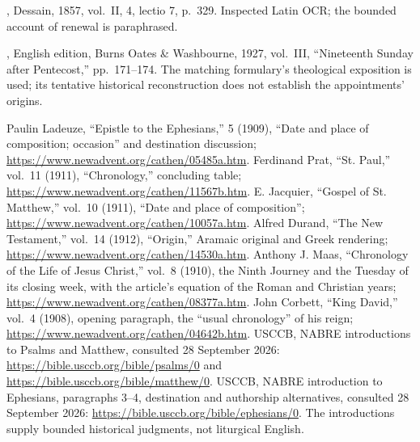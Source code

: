\begin{description}[style=nextline,leftmargin=0pt,labelsep=0pt,itemsep=.45em]
\item[Thomas Aquinas]
, Dessain,
1857, vol.~II,  4, lectio 7, p.~329.
Inspected Latin OCR; the bounded account of renewal is paraphrased.

\item[Blessed Ildefonso Schuster]
, English edition, Burns Oates \& Washbourne,
1927, vol.~III, ``Nineteenth Sunday after Pentecost,'' pp.~171--174.
The matching formulary's theological exposition is used; its
tentative historical reconstruction does not establish the
appointments' origins.

\item[Scriptural chronology and location]
Paulin Ladeuze, ``Epistle to the Ephesians,''  5 (1909), ``Date and place of composition; occasion''
and destination discussion;
\url{https://www.newadvent.org/cathen/05485a.htm}.
Ferdinand Prat, ``St. Paul,'' vol.~11 (1911), ``Chronology,''
concluding table; \url{https://www.newadvent.org/cathen/11567b.htm}.
E. Jacquier, ``Gospel of St. Matthew,'' vol.~10 (1911), ``Date
and place of composition'';
\url{https://www.newadvent.org/cathen/10057a.htm}.
Alfred Durand, ``The New Testament,'' vol.~14 (1912), ``Origin,''
Aramaic original and Greek rendering;
\url{https://www.newadvent.org/cathen/14530a.htm}.
Anthony J. Maas, ``Chronology of the Life of Jesus Christ,'' vol.~8
(1910), the Ninth Journey and the Tuesday of its closing week,
with the article's equation of the Roman and Christian years;
\url{https://www.newadvent.org/cathen/08377a.htm}.
John Corbett, ``King David,'' vol.~4 (1908), opening paragraph,
the ``usual chronology'' of his reign;
\url{https://www.newadvent.org/cathen/04642b.htm}.
USCCB, NABRE introductions to Psalms and Matthew, consulted
28 September 2026: \url{https://bible.usccb.org/bible/psalms/0}
and \url{https://bible.usccb.org/bible/matthew/0}.
USCCB, NABRE introduction to Ephesians, paragraphs 3--4,
destination and authorship alternatives, consulted 28 September 2026:
\url{https://bible.usccb.org/bible/ephesians/0}.
The introductions supply bounded historical judgments, not
liturgical English.
\end{description}
